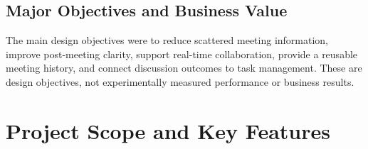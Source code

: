 \documentclass[11pt,a4paper]{article}
\begin{document}
\subsection{Major Objectives and Business Value}
The main design objectives were to reduce scattered meeting information, improve post-meeting clarity, support real-time collaboration, provide a reusable meeting history, and connect discussion outcomes to task management. These are design objectives, not experimentally measured performance or business results.

\newpage

\section{Project Scope and Key Features}
\end{document}
